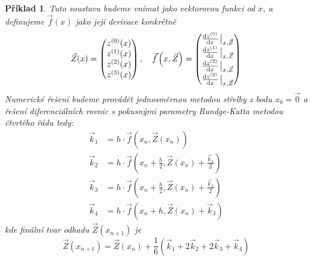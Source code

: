 \documentclass{article}
\newtheorem{example}{Příklad}
\begin{document}
\begin{example}
    Tuto soustavu budeme vnímat jako vektorovou funkci od $x$, a definujeme $\vec{f}(x)$ jako její derivace konkrétně 
    \begin{equation}
        \vec{Z}(x) = 
            \begin{pmatrix}
                z^{(0)}(x) \\ 
                z^{(1)}(x) \\
                z^{(2)}(x) \\
                z^{(3)}(x) \\ 
            \end{pmatrix} \qcomma 
        \vec{f}\left(x,\vec{Z}\right) = 
            \begin{pmatrix}
                \dv{z^{(0)}}{x}\eval_{x,\vec{Z}}\\
                \dv{z^{(1)}}{x}\eval_{x,\vec{Z}}\\
                \dv{z^{(2)}}{x}\eval_{x,\vec{Z}}\\
                \dv{z^{(3)}}{x}\eval_{x,\vec{Z}}\\
            \end{pmatrix} 
    \end{equation}
    Numerické řešení budeme provádět jednosměrnou metodou střelby z bodu $x_{0} = \vec{0}$ a řešení diferenciálních rovnic s pokusnými parametry Rundge-Kutta metodou čtvrtého řádu tedy:
    \begin{equation}
        \begin{aligned}
            \vec{k}_{1} &= h \cdot \vec{f}\left(  x_{n}, \vec{Z}(x_{n}) \right) \\ 
            \vec{k}_{2} &= h \cdot \vec{f}\left(  x_{n} + \frac{h}{2}, \vec{Z}(x_{n}) + \frac{\vec{k}_{1}}{2} \right) \\
            \vec{k}_{3} &= h \cdot \vec{f}\left( x_{n} + \frac{h}{2}, \vec{Z}(x_{n}) + \frac{\vec{k}_{2}}{2}  \right) \\
            \vec{k}_{4} &= h \cdot \vec{f}\left( x_{n} + h, \vec{Z}(x_{n}) + \vec{k}_{3}  \right)
        \end{aligned}
    \end{equation}
    kde finální tvar odhadu $\vec{Z}(x_{n+1})$ je
    \begin{equation}
\vec{Z}(x_{n+1}) = \vec{Z}(x_{n}) + \frac{1}{6}  \left(\vec{k}_{1} +  2\vec{k}_{2} + 2\vec{k}_{3} + \vec{k}_{4} \right)
    \end{equation}


\end{example}
\end{document}
